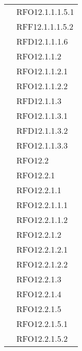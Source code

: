 \begin{longtable}{ p{12cm} | p{4cm} }
			& RFO12.1.1.1.5.1 \\
			& RFF12.1.1.1.5.2 \\
			& RFD12.1.1.1.6 \\
			& RFO12.1.1.2 \\
			& RFO12.1.1.2.1 \\
			& RFO12.1.1.2.2 \\
			& RFD12.1.1.3 \\
			& RFO12.1.1.3.1 \\
			& RFD12.1.1.3.2 \\
			& RFO12.1.1.3.3 \\
			& RFO12.2 \\
			& RFO12.2.1 \\
			& RFO12.2.1.1 \\
			& RFO12.2.1.1.1 \\
			& RFO12.2.1.1.2 \\
			& RFO12.2.1.2 \\
			& RFO12.2.1.2.1 \\
			& RFO12.2.1.2.2 \\
			& RFO12.2.1.3 \\
			& RFO12.2.1.4 \\
			& RFO12.2.1.5 \\
			& RFO12.2.1.5.1 \\
			& RFO12.2.1.5.2 \\
			

\end{longtable}
